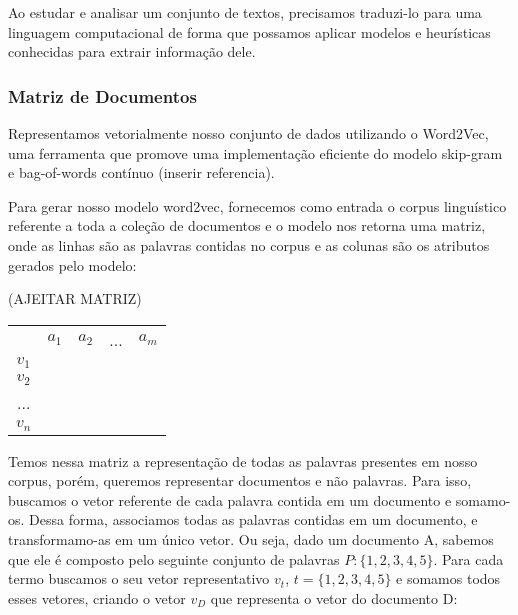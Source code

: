 \documentclass[a4paper,12pt]{article}
\begin{document}
Ao estudar e analisar um conjunto de textos, precisamos traduzi-lo para uma linguagem computacional de forma que possamos aplicar modelos e heurísticas 
conhecidas para extrair informação dele.


\subsubsection{Matriz de Documentos}

Representamos vetorialmente nosso conjunto de dados utilizando o Word2Vec, uma ferramenta que promove uma implementação eficiente do
modelo skip-gram e bag-of-words contínuo (inserir referencia).

Para gerar nosso modelo word2vec, fornecemos como entrada o corpus linguístico referente a toda a coleção de documentos
e o modelo nos retorna uma matriz, onde as linhas são as palavras contidas no corpus e as colunas são os atributos gerados pelo modelo:

(AJEITAR MATRIZ)
\begin{center}
 \begin{tabular}{ccccc}
          & $a_{1}$ & $a_{2}$ & ... & $a_{m}$ \\ \cline{2-5}
    $v_{1}$ &    &    &     &    \\
    $v_{2}$ &    &    &     &    \\
    ...  &    &    &     &    \\
    $v_{n}$ &    &    &     &    \\
    \end{tabular}
 
\end{center}


Temos nessa matriz a representação de todas as palavras presentes em nosso corpus, porém, queremos representar documentos e não palavras.
Para isso, buscamos o vetor referente de cada palavra contida em um documento e somamo-os. Dessa forma, associamos todas as palavras contidas
em um documento, e transformamo-as em um único vetor. Ou seja, dado um documento A, sabemos que ele é composto pelo seguinte conjunto de palavras
$P:\{1,2,3,4,5\}$. Para cada termo buscamos o seu vetor representativo $v_{t}$, $t =\{1,2,3,4,5\}$ e somamos todos esses vetores, criando o vetor
$v_{D}$ que representa o vetor do documento D:
\end{document}
